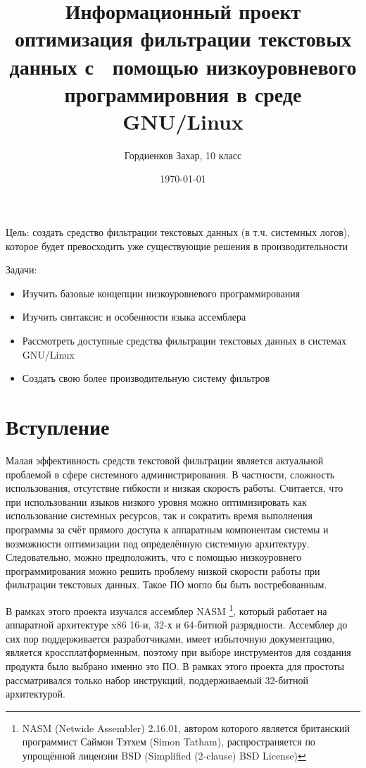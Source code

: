 \documentclass[a4paper]{article}
\title{Информационный проект \flqq{}оптимизация фильтрации текстовых данных с \
	помощью низкоуровневого программировния в среде GNU/Linux\frqq{}}
\author{Гордиенков Захар, 10 класс}
\date{\today}
\begin{document}
\maketitle
\pagebreak
{\small\tableofcontents}
\pagebreak

Цель: создать средство фильтрации текстовых данных (в т.ч. системных логов),
которое будет превосходить уже существующие решения в
производительности

Задачи:
\begin{itemize}
	\item Изучить базовые концепции низкоуровневого программирования
	\item Изучить синтаксис и особенности языка ассемблера
	\item Рассмотреть доступные средства фильтрации текстовых данных в
	системах GNU/Linux
	\item Создать свою более производительную систему фильтров
\end{itemize}

\pagebreak
\section{Вступление}
	Малая эффективность средств текстовой фильтрации является актуальной
	проблемой в сфере системного администрирования. В частности, сложность
	использования, отсутствие гибкости и низкая скорость работы. Считается,
	что при использовании языков низкого уровня можно оптимизировать как
	использование системных ресурсов, так и сократить время выполнения
	программы за счёт прямого доступа к аппаратным компонентам системы и
	возможности оптимизации под определённую системную архитектуру.
	Следовательно, можно предположить, что с помощью низкоуровнего
	программирования можно решить проблему низкой скорости работы при
	фильтрации текстовых данных. Такое ПО могло бы быть востребованным.

	В рамках этого проекта изучался ассемблер NASM
	\footnote{NASM (Netwide Assembler) 2.16.01, автором которого является
	британский программист Саймон Тэтхем (Simon Tatham), распространяется
	по упрощённой лицензии BSD (Simplified (2-clause) BSD License)},
	который работает на аппаратной архитектуре x86 16-и, 32-х и 64-битной
	разрядности. Ассемблер до сих пор поддерживается разработчиками, имеет
	избыточную документацию, является кроссплатформенным, поэтому при выборе
	инструментов для создания продукта было выбрано именно это ПО. В рамках
	этого проекта для простоты рассматривался только набор инструкций,
	поддерживаемый 32-битной архитектурой.
\pagebreak
\end{document}
